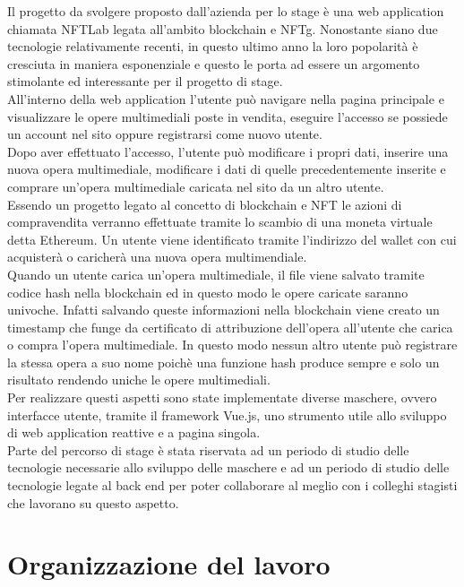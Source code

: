 Il progetto da svolgere proposto dall'azienda per lo stage è una web application chiamata NFTLab legata all'ambito blockchain e \gls{NFTg}. Nonostante siano due tecnologie relativamente recenti, in questo ultimo anno la loro popolarità è cresciuta in maniera esponenziale e questo le porta ad essere un argomento stimolante ed interessante per il progetto di stage.\\
All'interno della web application l'utente può navigare nella pagina principale e visualizzare le opere multimediali poste in vendita, eseguire l'accesso se possiede un account nel sito oppure registrarsi come nuovo utente.\\
Dopo aver effettuato l'accesso, l'utente può modificare i propri dati, inserire una nuova opera multimediale, modificare i dati di quelle precedentemente inserite e comprare un'opera multimediale caricata nel sito da un altro utente.\\
Essendo un progetto legato al concetto di blockchain e \gls{NFT} le azioni di compravendita verranno effettuate tramite lo scambio di una moneta virtuale detta Ethereum. Un utente viene identificato tramite l'indirizzo del wallet con cui acquisterà o caricherà una nuova opera multimendiale.\\
Quando un utente carica un'opera multimediale, il file viene salvato tramite codice hash nella blockchain ed in questo modo le opere caricate saranno univoche. Infatti salvando queste informazioni nella blockchain viene creato un timestamp che funge da certificato di attribuzione dell'opera all'utente che carica o compra l'opera multimediale. In questo modo nessun altro utente può registrare la stessa opera a suo nome poichè una funzione hash produce sempre e solo un risultato rendendo uniche le opere multimediali.\\
Per realizzare questi aspetti sono state implementate diverse maschere, ovvero interfacce utente, tramite il framework Vue.js, uno strumento utile allo sviluppo di web application reattive e a pagina singola.\\
Parte del percorso di stage è stata riservata ad un periodo di studio delle tecnologie necessarie allo sviluppo delle maschere e ad un periodo di studio delle tecnologie legate al back end per poter collaborare al meglio con i colleghi stagisti che lavorano su questo aspetto.

\section{Organizzazione del lavoro}

